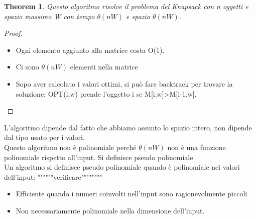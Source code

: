 \documentclass{article}
\newtheorem{theorem}{Theorem}[subsection]
\begin{document}
\begin{theorem}
    Questo algoritmo risolve il problema del Knapsack con n oggetti e spazio massimo W con tempo $\theta(nW)$ e spazio $\theta(nW)$.
\end{theorem}
\begin{proof}
    \begin{itemize}
        \item Ogni elemento aggiunto alla matrice costa O(1).
        \item Ci sono $\theta (nW)$ elementi nella matrice
        \item Sopo aver calcolato i valori ottimi, si può fare backtrack per trovare la soluzione: OPT(i,w) prende l'oggetto i se M[i,w]>M[i-1,w].
    \end{itemize}
\end{proof}
L'algoritmo dipende dal fatto che abbiamo assunto lo spazio intero, non dipende dal tipo usato per i valori.\\
Questo algoritmo non è polinomiale perché $\theta (nW)$ non è una funzione polinomiale rispetto all'input. Si definisce pseudo polinomiale.\\
Un algoritmo si definisce pseudo polinomiale quando è polinomiale nei valori dell'input: """"""verificare""""""""
\begin{itemize}
    \item Efficiente quando i numeri coinvolti nell'input sono ragionevolmente piccoli
    \item Non necessariamente polinomiale nella dimensione dell'input.
\end{itemize}
\end{document}

